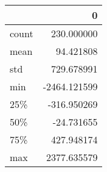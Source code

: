 \begin{tabular}{lr}
\toprule
{} &            0 \\
\midrule
count &   230.000000 \\
mean  &    94.421808 \\
std   &   729.678991 \\
min   & -2464.121599 \\
25\%   &  -316.950269 \\
50\%   &   -24.731655 \\
75\%   &   427.948174 \\
max   &  2377.635579 \\
\bottomrule
\end{tabular}
